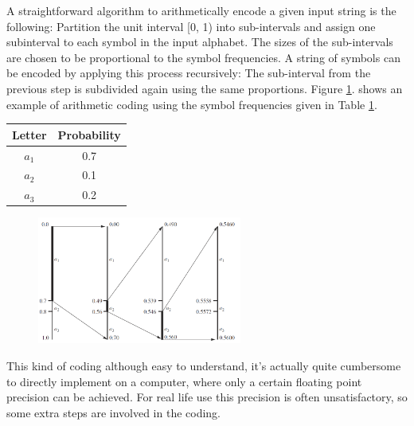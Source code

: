       A straightforward algorithm to arithmetically encode a given input string is the
      following: Partition the unit interval [0, 1) into sub-intervals and assign one subinterval
      to each symbol in the input alphabet. The sizes of the sub-intervals are
      chosen to be proportional to the symbol frequencies. A string of symbols can be
      encoded by applying this process recursively: The sub-interval from the previous
      step is subdivided again using the same proportions. Figure \ref{fig:arithmetic}. shows an example of
      arithmetic coding using the symbol frequencies given in Table \ref{tab:arithmetic}.

      \begin{table}
        \centering
        \begin{tabular}{cc}
          \toprule
          Letter & Probability \\
          \midrule
          $a_1$ & 0.7 \\
          $a_2$ & 0.1 \\
          $a_3$ & 0.2 \\
          \bottomrule
        \end{tabular}
        \label{tab:arithmetic}
      \end{table}

      \begin{figure}
        \centering
        \includegraphics[width=0.6\textwidth]{arithmetic}
        \label{fig:arithmetic}
      \end{figure}

      This kind of coding although easy to understand, it's actually quite cumbersome to directly implement on a computer, where only a certain floating point precision can be achieved. For real life use this precision is often unsatisfactory, so some extra steps are involved in the coding.

